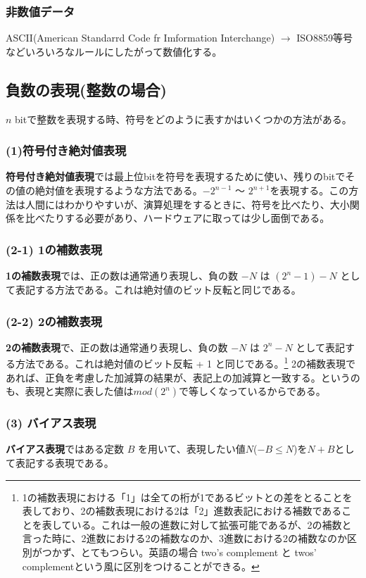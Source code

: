 \documentclass[a4j,10pt,oneside,openany,fleqn]{jsbook}
\begin{document}
\subsubsection{非数値データ}
ASCII(American Standarrd Code fr Imformation Interchange) $\rightarrow$ ISO8859等号\\
などいろいろなルールにしたがって数値化する。

\subsection{負数の表現(整数の場合)}
$n$ bitで整数を表現する時、符号をどのように表すかはいくつかの方法がある。

\subsubsection{(1)符号付き絶対値表現}
\textbf{符号付き絶対値表現}では最上位bitを符号を表現するために使い、残りのbitでその値の絶対値を表現するような方法である。$-2^{n-1}$ 〜 $2^{n+1}$を表現する。この方法は人間にはわかりやすいが、演算処理をするときに、符号を比べたり、大小関係を比べたりする必要があり、ハードウェアに取っては少し面倒である。

\subsubsection{(2-1) 1の補数表現}
\textbf{1の補数表現}では、正の数は通常通り表現し、負の数 $-N$ は $(2^n - 1) - N$ として表記する方法である。これは絶対値のビット反転と同じである。

\subsubsection{(2-2) 2の補数表現}
\textbf{2の補数表現}で、正の数は通常通り表現し、負の数 $-N$ は $2^n - N$ として表記する方法である。これは絶対値のビット反転 + 1 と同じである。\footnote{1の補数表現における「1」は全ての桁が1であるビットとの差をとることを表しており、2の補数表現における2は「2」進数表記における補数であることを表している。これは一般の進数に対して拡張可能であるが、2の補数と言った時に、2進数における2の補数なのか、3進数における2の補数なのか区別がつかず、とてもつらい。英語の場合 two's complement と twos' complementという風に区別をつけることができる。}
2の補数表現であれば、正負を考慮した加減算の結果が、表記上の加減算と一致する。というのも、表現と実際に表した値は$mod (2^n)$で等しくなっているからである。

\subsubsection{(3) バイアス表現}
\textbf{バイアス表現}ではある定数 $B$ を用いて、表現したい値$N$($-B\leq N$)を$N+B$として表記する表現である。
\end{document}
